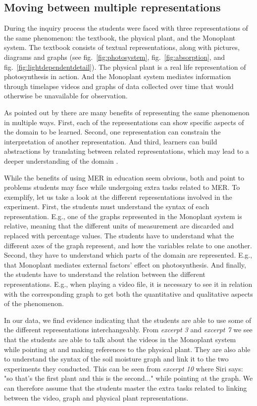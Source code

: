 \subsection{Moving between multiple representations}
During the inquiry process the students were faced with three representations of the same phenomenon: the textbook, the physical plant, and the Monoplant system. The textbook consists of textual representations, along with pictures, diagrams and graphs (see fig.~\ref{fig:photosystem}, fig.~\ref{fig:absorption}, and fig.~\ref{fig:lightdependentdetail}). The physical plant is a real life representation of photosynthesis in action. And the Monoplant system mediates information through timelapse videos and graphs of data collected over time that would otherwise be unavailable for observation.  

As pointed out by \citet{van2006supporting} there are many benefits of representing the same phenomenon in multiple ways. First, each of the representations can show specific aspects of the domain to be learned. Second, one representation can constrain the interpretation of another representation. And third, learners can build abstractions by translating between related representations, which may lead to a deeper understanding of the domain \citep{ainsworth1999functions}. 

While the benefits of using MER in education seem obvious, both \citet{ainsworth1999functions} and \citet{van2006supporting} point to problems students may face while undergoing extra tasks related to MER. To exemplify, let us take a look at the different representations involved in the experiment. First, the students must understand the syntax of each representation. E.g., one of the graphs represented in the Monoplant system is relative, meaning that the different units of measurement are discarded and replaced with percentage values. The students have to understand what the different axes of the graph represent, and how the variables relate to one another. Second, they have to understand which parts of the domain are represented. E.g., that Monoplant mediates external factors' effect on photosynthesis. And finally, the students have to understand the relation between the different representations. E.g., when playing a video file, it is necessary to see it in relation with the corresponding graph to get both the quantitative and qualitative aspects of the phenomenon.

In our data, we find evidence indicating that the students are able to use some of the different representations interchangeably. From \emph{excerpt 3} and \emph{excerpt 7} we see that the students are able to talk about the videos in the Monoplant system while pointing at and making references to the physical plant. They are also able to understand the syntax of the soil moisture graph and link it to the two experiments they conducted. This can be seen from \emph{excerpt 10} where Siri says: "so that's the first plant and this is the second..." while pointing at the graph. We can therefore assume that the students master the extra tasks related to linking between the video, graph and physical plant representations. 

